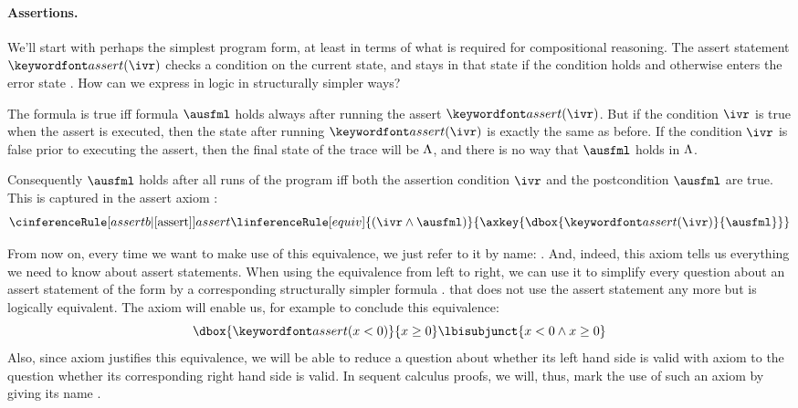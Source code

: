 \documentclass[11pt,twoside]{scrartcl}
\begin{document}
\paragraph{Assertions.}

We'll start with perhaps the simplest program form, at least in terms of what is required for compositional reasoning.
The assert statement $\passert{\ivr}$ checks a condition on the current state, and stays in that state if the condition holds and otherwise enters the error state \errstate.
How can we express \m{\dbox{\passert{\ivr}}{\ausfml}} in logic in structurally simpler ways?

The formula \m{\dbox{\passert{\ivr}}{\ausfml}} is true iff formula $\ausfml$ holds always after running the assert $\passert{\ivr}$. But if the condition $\ivr$ is true when the assert is executed, then the state after running $\passert{\ivr}$ is exactly the same as before. If the condition $\ivr$ is false prior to executing the assert, then the final state of the trace will be $\Lambda$, and there is no way that $\ausfml$ holds in $\Lambda$.

Consequently $\ausfml$ holds after all runs of the program \m{\passert{\ivr}} iff both the assertion condition $\ivr$ and the postcondition $\ausfml$ are true.
This is captured in the assert axiom :
\[
\cinferenceRule[assertb|$\dibox{\text{assert}}$]{assert}
{\linferenceRule[equiv]
  {(\ivr \land \ausfml)}
  {\axkey{\dbox{\passert{\ivr}}{\ausfml}}}
}{}%
\]

From now on, every time we want to make use of this equivalence, we just refer to it by name: .
And, indeed, this axiom tells us everything we need to know about assert statements.
When using the equivalence  from left to right, we can use it to simplify every question about an assert statement of the form \m{\dbox{\passert{\busfml}}{\ausfml}}  by a corresponding structurally simpler formula .
that does not use the assert statement any more but is logically equivalent.
The axiom will enable us, for example to conclude this equivalence:
\[
{\dbox{\passert{x < 0}}{x \ge 0}}
\lbisubjunct
{x < 0 \land x \ge 0}
\]
Also, since axiom  justifies this equivalence, we will be able to reduce a question about whether its left hand side is valid with axiom  to the question whether its corresponding right hand side is valid.
In sequent calculus proofs, we will, thus, mark the use of such an axiom by giving its name .
\end{document}
